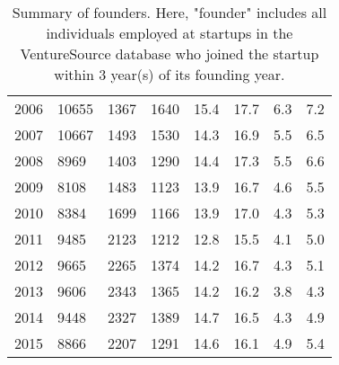 \begin{table}[!htb]
\begin{tabular}{p{1.75cm}p{1.75cm}p{1.75cm}p{1.75cm}p{1.75cm}p{1.75cm}p{1.75cm}p{1.75cm}}
  2006 & 10655 & 1367 & 1640 & 15.4 & 17.7 & 6.3 & 7.2 \\ 
  2007 & 10667 & 1493 & 1530 & 14.3 & 16.9 & 5.5 & 6.5 \\ 
  2008 & 8969 & 1403 & 1290 & 14.4 & 17.3 & 5.5 & 6.6 \\ 
  2009 & 8108 & 1483 & 1123 & 13.9 & 16.7 & 4.6 & 5.5 \\ 
  2010 & 8384 & 1699 & 1166 & 13.9 & 17.0 & 4.3 & 5.3 \\ 
  2011 & 9485 & 2123 & 1212 & 12.8 & 15.5 & 4.1 & 5.0 \\ 
  2012 & 9665 & 2265 & 1374 & 14.2 & 16.7 & 4.3 & 5.1 \\ 
  2013 & 9606 & 2343 & 1365 & 14.2 & 16.2 & 3.8 & 4.3 \\ 
  2014 & 9448 & 2327 & 1389 & 14.7 & 16.5 & 4.3 & 4.9 \\ 
  2015 & 8866 & 2207 & 1291 & 14.6 & 16.1 & 4.9 & 5.4 \\ 
   \bottomrule
\end{tabular}
\endgroup
\caption{Summary of founders. Here, "founder" includes all individuals employed at startups in the VentureSource database who joined the startup within 3 year(s) of its founding year.} 
\label{table:GStable_all}
\end{table}
